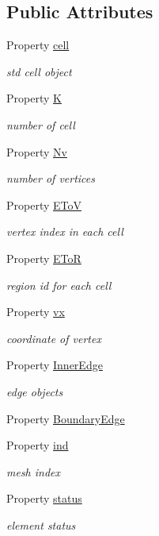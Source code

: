 \subsection*{Public Attributes}
\begin{DoxyCompactItemize}
\item 
Property \hyperlink{class_ndg_mesh_a6f128cd638adcec9a184937ad483232a}{cell}
\begin{DoxyCompactList}\small\item\em std cell object \end{DoxyCompactList}\item 
Property \hyperlink{class_ndg_mesh_a81fc6a6affd3609e69eb1b8fc72b7f2f}{K}
\begin{DoxyCompactList}\small\item\em number of cell \end{DoxyCompactList}\item 
Property \hyperlink{class_ndg_mesh_a1d100eb162c56c890e007b8d2ff267a3}{Nv}
\begin{DoxyCompactList}\small\item\em number of vertices \end{DoxyCompactList}\item 
Property \hyperlink{class_ndg_mesh_a3ab88286c8e628f39ad7654d8e43fd96}{E\+ToV}
\begin{DoxyCompactList}\small\item\em vertex index in each cell \end{DoxyCompactList}\item 
Property \hyperlink{class_ndg_mesh_a58a82bb05a658319454739725b098e2a}{E\+ToR}
\begin{DoxyCompactList}\small\item\em region id for each cell \end{DoxyCompactList}\item 
Property \hyperlink{class_ndg_mesh_a2b7b3abe64802afdb217cce9a2cb3f04}{vx}
\begin{DoxyCompactList}\small\item\em coordinate of vertex \end{DoxyCompactList}\item 
Property \hyperlink{class_ndg_mesh_adc2916d6aaab872ca9691c5875840247}{Inner\+Edge}
\begin{DoxyCompactList}\small\item\em edge objects \end{DoxyCompactList}\item 
Property \hyperlink{class_ndg_mesh_ad43c25587bce433cd86ffd81c879cd59}{Boundary\+Edge}
\item 
Property \hyperlink{class_ndg_mesh_af4781cdcbbdf741fd77ad9823eb03084}{ind}
\begin{DoxyCompactList}\small\item\em mesh index \end{DoxyCompactList}\item 
Property \hyperlink{class_ndg_mesh_affdc8928898926791676417cc9d300f2}{status}
\begin{DoxyCompactList}\small\item\em element status \end{DoxyCompactList}\end{DoxyCompactItemize}
